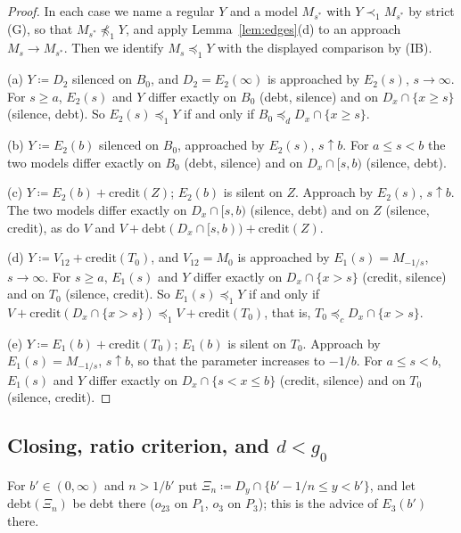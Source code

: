 \documentclass[11pt]{article}
\theoremstyle{definition}\newtheorem{definition}[theorem]{Definition}
\theoremstyle{remark}\newtheorem{remark}[theorem]{Remark}
\newcommand{\debt}{\mathrm{debt}}
\newcommand{\cred}{\mathrm{credit}}
\newcommand{\Band}{\Xi}
\begin{document}
\begin{proof}
In each case we name a regular $Y$ and a model $M_{s^*}$ with
$Y\prec_1M_{s^*}$ by strict (G), so that $M_{s^*}\not\preceq_1Y$, and apply
Lemma~\ref{lem:edges}(d) to an approach $M_s\to M_{s^*}$. Then we identify
$M_s\preceq_1Y$ with the displayed comparison by (IB).

(a) $Y\coloneqq D_2$ silenced on $B_0$, and $D_2=E_2(\infty)$ is approached by
$E_2(s)$, $s\to\infty$. For $s\ge a$, $E_2(s)$ and $Y$ differ exactly on
$B_0$ (debt, silence) and on $D_x\cap\{x\ge s\}$ (silence, debt). So
$E_2(s)\preceq_1Y$ if and only if $B_0\preceq_dD_x\cap\{x\ge s\}$.

(b) $Y\coloneqq E_2(b)$ silenced on $B_0$, approached by $E_2(s)$, $s\uparrow
b$. For $a\le s<b$ the two models differ exactly on $B_0$ (debt, silence)
and on $D_x\cap[s,b)$ (silence, debt).

(c) $Y\coloneqq E_2(b)+\cred(Z)$; $E_2(b)$ is silent on $Z$. Approach by
$E_2(s)$, $s\uparrow b$. The two models differ exactly on $D_x\cap[s,b)$
(silence, debt) and on $Z$ (silence, credit), as do $V$ and
$V+\debt(D_x\cap[s,b))+\cred(Z)$.

(d) $Y\coloneqq V_{12}+\cred(T_0)$, and $V_{12}=M_0$ is approached by
$E_1(s)=M_{-1/s}$, $s\to\infty$. For $s\ge a$, $E_1(s)$ and $Y$ differ
exactly on $D_x\cap\{x>s\}$ (credit, silence) and on $T_0$ (silence, credit).
So $E_1(s)\preceq_1Y$ if and only if
$V+\cred(D_x\cap\{x>s\})\preceq_1V+\cred(T_0)$, that is,
$T_0\preceq_cD_x\cap\{x>s\}$.

(e) $Y\coloneqq E_1(b)+\cred(T_0)$; $E_1(b)$ is silent on $T_0$. Approach by
$E_1(s)=M_{-1/s}$, $s\uparrow b$, so that the parameter increases to
$-1/b$. For $a\le s<b$, $E_1(s)$ and $Y$ differ exactly on $D_x\cap\{s<x\le
b\}$ (credit, silence) and on $T_0$ (silence, credit).
\end{proof}

\subsection{Closing, ratio criterion, and \texorpdfstring{$d<g_0$}{d<g0}}

For $b'\in(0,\infty)$ and $n>1/b'$ put
$\Band_n\coloneqq D_y\cap\{b'-1/n\le y<b'\}$, and let $\debt(\Band_n)$ be
debt there ($o_{23}$ on $P_1$, $o_3$ on $P_3$); this is the advice of
$E_3(b')$ there.
\end{document}
